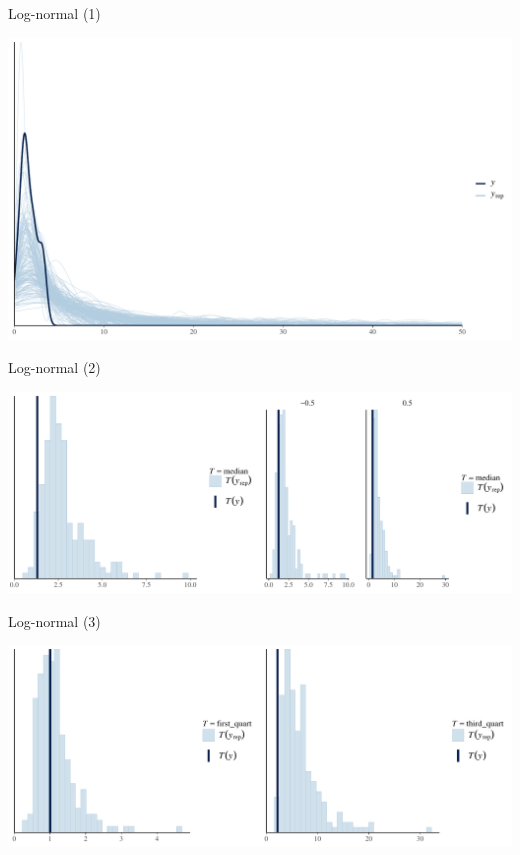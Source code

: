 \documentclass[ignorenonframetext,a4paper]{beamer}
\begin{document}
\begin{frame}{Log-normal (1)}

\includegraphics{DB_presentation_case_study_files/figure-beamer/unnamed-chunk-17-1.pdf}

\end{frame}

\begin{frame}{Log-normal (2)}

\includegraphics{DB_presentation_case_study_files/figure-beamer/unnamed-chunk-18-1.pdf}

\end{frame}

\begin{frame}{Log-normal (3)}

\includegraphics{DB_presentation_case_study_files/figure-beamer/unnamed-chunk-19-1.pdf}

\end{frame}
\end{document}
